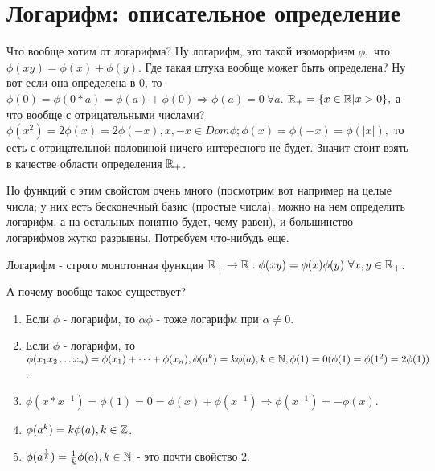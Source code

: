 \documentclass[12pt]{report}
\begin{document}
\section{Логарифм: описательное определение}

\begin{rem}
Что вообще хотим от логарифма? Ну логарифм, это такой изоморфизм $\phi,$ что $\phi(xy) = \phi(x) + \phi(y)$. Где такая штука вообще может быть определена? Ну вот если она определена в $0$, то $\phi(0) = \phi(0 * a) = \phi(a) + \phi(0) \Rightarrow \phi(a) = 0 ~\forall a$. $\mathbb{R}_{+} = \{x \in \mathbb{R}| x > 0\},$ а что вообще с отрицательными числами? $\phi(x^2) = 2 \phi(x) = 2\phi(-x), x, -x \in Dom \phi; \phi(x) = \phi(-x) = \phi(|x|),$ то есть с отрицательной половиной ничего интересного не будет. Значит стоит взять в качестве области определения $\mathbb{R}_{+}$.

Но функций с этим свойстом очень много (посмотрим вот например на целые числа; у них есть бесконечный базис (простые числа), можно на нем определить логарифм, а на остальных понятно будет, чему равен), и большинство логарифмов жутко разрывны. Потребуем что-нибудь еще.
\end{rem}

\begin{defn}
Логарифм - строго монотонная функция $\mathbb{R}_{+} \to \mathbb{R}: \phi(xy) = \phi(x)\phi(y) ~\forall x, y \in \mathbb{R}_{+}$.

А почему вообще такое существует?
\end{defn}

\begin{prop}
\begin{enumerate}
\item Если $\phi$ - логарифм, то $\alpha \phi$ - тоже логарифм при $\alpha \neq 0$.
\item Если $\phi$ - логарифм, то $\phi(x_1 x_2 \dots x_n) = \phi(x_1) + \dots + \phi(x_n), \phi(a^k) = k\phi(a), k \in \mathbb{N}, \phi(1) = 0 (\phi(1) = \phi(1^2) = 2\phi(1))$. 
\item $\phi(x * x^{-1}) = \phi(1) = 0 = \phi(x) + \phi(x^{-1}) \Rightarrow \phi(x^{-1}) = -\phi(x)$.
\item $\phi(a^k) = k\phi(a), k \in \mathbb{Z}$.
\item $\phi(a^{\frac{1}{k}}) = \frac{1}{k}\phi(a), k \in \mathbb{N}$ - это почти свойство $2$.
\end{enumerate}
\end{prop}
\end{document}
